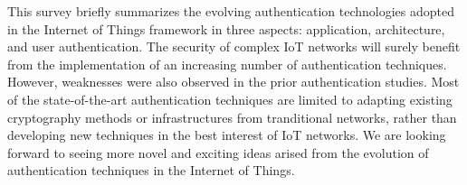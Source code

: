 This survey briefly summarizes the evolving authentication technologies adopted in the Internet of Things framework in three aspects: application, architecture, and user authentication. The security of complex IoT networks will surely benefit from the implementation of an increasing number of authentication techniques. However, weaknesses were also observed in the prior authentication studies. Most of the state-of-the-art authentication techniques are limited to adapting existing cryptography methods or infrastructures from tranditional networks, rather than developing new techniques in the best interest of IoT networks. We are looking forward to seeing more novel and exciting ideas arised from the evolution of authentication techniques in the Internet of Things.